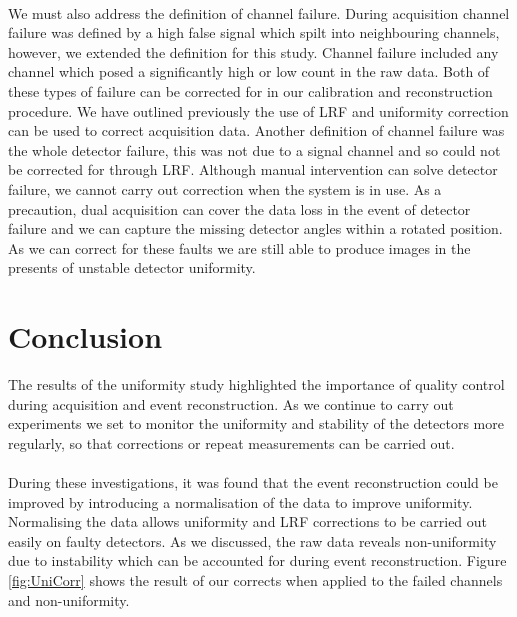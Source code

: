 \paragraph{}
We must also address the definition of channel failure. During acquisition channel failure was defined by a high false signal which spilt into neighbouring channels, however, we extended the definition for this study. Channel failure included any channel which posed a significantly high or low count in the raw data. Both of these types of failure can be corrected for in our calibration and reconstruction procedure. We have outlined previously the use of \acrshort{LRF} and uniformity correction can be used to correct acquisition data. Another definition of channel failure was the whole detector failure, this was not due to a signal channel and so could not be corrected for through \acrshort{LRF}. Although manual intervention can solve detector failure, we cannot carry out correction when the system is in use. As a precaution, dual acquisition can cover the data loss in the event of detector failure and we can capture the missing detector angles within a rotated position. As we can correct for these faults we are still able to produce images in the presents of unstable detector uniformity. 

\section{Conclusion}
The results of the uniformity study highlighted the importance of quality control during acquisition and event reconstruction. As we continue to carry out experiments we set to monitor the uniformity and stability of the detectors more regularly, so that corrections or repeat measurements can be carried out.
\paragraph{}
During these investigations, it was found that the event reconstruction could be improved by introducing a normalisation of the data to improve uniformity. Normalising the data allows uniformity and \acrshort{LRF} corrections to be carried out easily on faulty detectors. As we discussed, the raw data reveals non-uniformity due to instability which can be accounted for during event reconstruction. Figure \ref{fig:UniCorr} shows the result of our corrects when applied to the failed channels and non-uniformity. 

